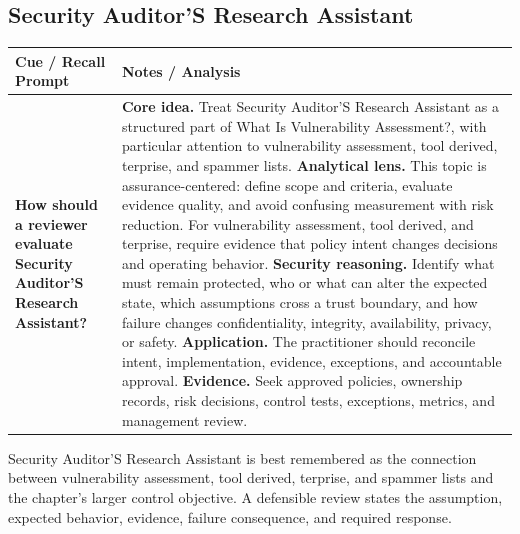 \documentclass[11pt]{article}
\newcommand{\CornellHeader}{%
\rowcolor{Navy}\color{white}\bfseries Cue / Recall Prompt & \color{white}\bfseries Notes / Analysis\\\hline}
\newcommand{\CornellRow}[2]{%
\cellcolor{CueGray}\RaggedRight\textbf{#1} & \RaggedRight #2\\\hline}
\begin{document}
\subsection*{Security Auditor'S Research Assistant}
\begin{longtable}{>{\RaggedRight\arraybackslash}p{}|>{\RaggedRight\arraybackslash}p{}}
\CornellHeader
\CornellRow{How should a reviewer evaluate Security Auditor'S Research Assistant?}{\textbf{Core idea.} Treat Security Auditor'S Research Assistant as a structured part of What Is Vulnerability Assessment?, with particular attention to vulnerability assessment, tool derived, terprise, and spammer lists. \textbf{Analytical lens.} This topic is assurance-centered: define scope and criteria, evaluate evidence quality, and avoid confusing measurement with risk reduction. For vulnerability assessment, tool derived, and terprise, require evidence that policy intent changes decisions and operating behavior. \textbf{Security reasoning.} Identify what must remain protected, who or what can alter the expected state, which assumptions cross a trust boundary, and how failure changes confidentiality, integrity, availability, privacy, or safety. \textbf{Application.} The practitioner should reconcile intent, implementation, evidence, exceptions, and accountable approval. \textbf{Evidence.} Seek approved policies, ownership records, risk decisions, control tests, exceptions, metrics, and management review.}
\end{longtable}
\begin{topicsummary}
Security Auditor'S Research Assistant is best remembered as the connection between vulnerability assessment, tool derived, terprise, and spammer lists and the chapter's larger control objective. A defensible review states the assumption, expected behavior, evidence, failure consequence, and required response.
\end{topicsummary}
\end{document}
